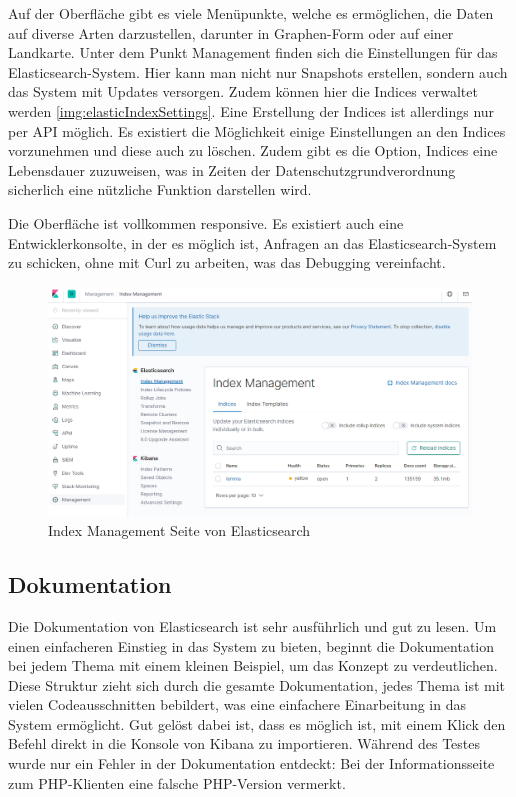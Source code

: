 Auf der Oberfläche gibt es viele Menüpunkte, welche es ermöglichen, die Daten auf diverse Arten darzustellen, darunter in Graphen-Form oder auf einer Landkarte. Unter dem Punkt Management finden sich die Einstellungen für das Elasticsearch-System. Hier kann man nicht nur Snapshots erstellen, sondern auch das System mit Updates versorgen. Zudem können hier die Indices verwaltet werden \ref{img:elasticIndexSettings}. Eine Erstellung der Indices ist allerdings nur per API möglich. Es existiert die Möglichkeit einige Einstellungen an den Indices vorzunehmen und diese auch zu löschen. Zudem gibt es die Option, Indices eine Lebensdauer zuzuweisen, was in Zeiten der Datenschutzgrundverordnung sicherlich eine nützliche Funktion darstellen wird. 

Die Oberfläche ist vollkommen responsive. Es existiert auch eine Entwicklerkonsolte, in der es möglich ist, Anfragen an das Elasticsearch-System zu schicken, ohne mit Curl zu arbeiten, was das Debugging vereinfacht.

\begin{figure}
	\centering
	\includegraphics[width=1\linewidth]{images/elastic_ui.png}
	\caption{Index Management Seite von Elasticsearch}
	\label{img:elasticInterface}
\end{figure}


\subsection{Dokumentation}

Die Dokumentation von Elasticsearch ist sehr ausführlich und gut zu lesen. Um einen einfacheren Einstieg in das System zu bieten, beginnt die Dokumentation bei jedem Thema mit einem kleinen Beispiel, um das Konzept zu verdeutlichen. Diese Struktur zieht sich durch die gesamte Dokumentation, jedes Thema ist mit vielen Codeausschnitten bebildert, was eine einfachere Einarbeitung in das System ermöglicht. 
Gut gelöst dabei ist, dass es möglich ist, mit einem Klick den Befehl direkt in die Konsole von Kibana zu importieren. Während des Testes wurde nur ein Fehler in der Dokumentation entdeckt: Bei der Informationsseite zum PHP-Klienten eine falsche PHP-Version vermerkt.

